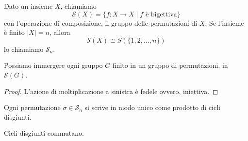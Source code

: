 \begin{multicols}{2}
\begin{definition}
	Dato un insieme $ X $, chiamiamo
	\[  \mathcal{S}(X) = \{ f: X \to X \mid f  \text{ è bigettiva}  \}  \]
	con l'operazione di composizione, il gruppo delle permutazioni di $ X $. Se l'insieme è finito $ |X| = n $, allora
	\[  \mathcal{S}(X) \cong S(\{ 1 ,2, \dots, n \})  \]
	lo chiamiamo $ \mathcal{S}_n $.
\end{definition}

\begin{theorem}[Cayley]\label{Cayley}
	Possiamo immergere ogni gruppo $ G $ finito in un gruppo di permutazioni, in $ \mathcal{S}(G) $.
\end{theorem}
\begin{proof}
	L'azione di moltiplicazione a sinistra è fedele
	ovvero, iniettiva.
\end{proof}

\begin{prop}
	Ogni permutazione $ \sigma \in \mathcal{S}_n $ si scrive in modo unico come prodotto di cicli disgiunti.
\end{prop}
\begin{remark}
	Cicli disgiunti commutano.
\end{remark}



\end{multicols}

